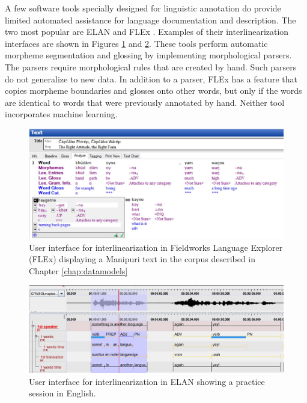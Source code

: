 A few software tools specially designed for linguistic annotation do provide limited automated assistance for language documentation and description. The two most popular are ELAN \citep{auer_elan_2010} and FLEx \citep{rogers_review_2010}. Examples of their interlinearization interfaces are shown in Figures \ref{fig:FLEX} and \ref{fig:ELAN}. These tools perform automatic morpheme segmentation and glossing by implementing morphological parsers. The parsers require morphological rules that are created by hand. Such parsers do not generalize to new data. In addition to a parser, FLEx has a feature that copies morpheme boundaries and glosses onto other words, but only if the words are identical to words that were previously annotated by hand. Neither tool incorporates machine learning. 

\begin{figure}[!tb]
    \centering
    \includegraphics[width=15cm]{figs/ManipuriFLEx.jpg}
    \caption[FLEx]{User interface for interlinearization in Fieldworks Language Explorer (FLEx) displaying a Manipuri text in the corpus described in Chapter \ref{chap:datamodels}}
    \label{fig:FLEX}
\end{figure}

\begin{figure}[!tb]
    \centering
    \includegraphics[width=12cm]{figs/ELANeng.jpg}
    \caption[ELAN]{User interface for interlinearization in ELAN showing a practice session in English.}
    \label{fig:ELAN}
\end{figure}

